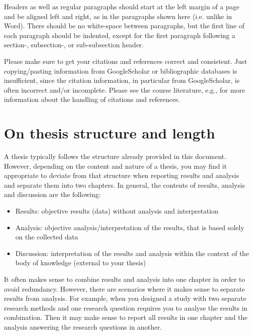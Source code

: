 \documentclass[a4paper,twoside]{bth}
\begin{document}
Headers as well as regular paragraphs should start at the left margin of a page and
be aligned left and right, as in the paragraphs shown here (i.e. unlike in Word).
There should be no white-space between paragraphs, but the first line of each
paragraph should be indented, except for the first paragraph following a section-,
subsection-, or sub-subsection header.

Please make sure to get your citations and references correct and consistent.
Just copying/pasting information from GoogleScholar or bibliographic databases is insufficient,
since the citation information, in particular from GoogleScholar, is often incorrect and/or incomplete.
Please see the course literature, e.g., \cite{berndtsson2007thesis,evans2014write,glasman2010science,zobel2014writing}
for more information about the handling of citations and references.


\section{On thesis structure and length}
A thesis typically follows the structure already provided in this document. However, depending on the content and nature of a thesis, you may find it appropriate to deviate from that structure when reporting results and analysis and separate them into two chapters. In general, the contents of results, analysis and discussion are the following:
\begin{itemize}
    \item Results: objective results (data) without analysis and interpretation
    \item Analysis: objective analysis/interpretation of the results, that is based solely on the collected data
    \item Discussion: interpretation of the results and analysis within the context of the body of knowledge (external to your thesis)
\end{itemize}

It often makes sense to combine results and analysis into one chapter in order to avoid redundancy. However, there are scenarios where it makes sense to separate results from analysis. For example, when you designed a study with two separate research methods and one research question requires you to analyse the results in combination. Then it may make sense to report all results in one chapter and the analysis answering the research questions in another.
\end{document}
